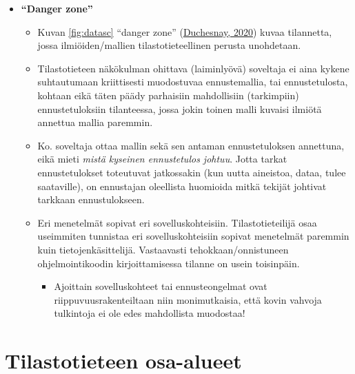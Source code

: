 \documentclass[
]{book}
\providecommand{\tightlist}{%
  \setlength{\itemsep}{0pt}\setlength{\parskip}{0pt}}
\begin{document}
\begin{itemize}
\tightlist
\item
  \textbf{``Danger zone''}

  \begin{itemize}
  \tightlist
  \item
    Kuvan \ref{fig:datasc} ``danger zone'' (\href{https://duchesnay.github.io/pystatsml/introduction/machine_learning.html}{Duchesnay, 2020}) kuvaa tilannetta, jossa ilmiöiden/mallien tilastotieteellinen perusta unohdetaan.
  \item
    Tilastotieteen näkökulman ohittava (laiminlyövä) soveltaja ei aina kykene suhtautumaan kriittisesti muodostuvaa ennustemallia, tai ennustetulosta, kohtaan eikä täten päädy parhaisiin mahdollisiin (tarkimpiin) ennustetuloksiin tilanteessa, jossa jokin toinen malli kuvaisi ilmiötä annettua mallia paremmin.
  \item
    Ko. soveltaja ottaa mallin sekä sen antaman ennustetuloksen annettuna, eikä mieti \emph{mistä kyseinen ennustetulos johtuu}. Jotta tarkat ennustetulokset toteutuvat jatkossakin (kun uutta aineistoa, dataa, tulee saataville), on ennustajan oleellista huomioida mitkä tekijät johtivat tarkkaan ennustulokseen.
  \item
    Eri menetelmät sopivat eri sovelluskohteisiin. Tilastotieteilijä osaa useimmiten tunnistaa eri sovelluskohteisiin sopivat menetelmät paremmin kuin tietojenkäsittelijä. Vastaavasti tehokkaan/onnistuneen ohjelmointikoodin kirjoittamisessa tilanne on usein toisinpäin.

    \begin{itemize}
    \tightlist
    \item
      Ajoittain sovelluskohteet tai ennusteongelmat ovat riippuvuusrakenteiltaan niin monimutkaisia, että kovin vahvoja tulkintoja ei ole edes mahdollista muodostaa!
    \end{itemize}
  \end{itemize}
\end{itemize}

\hypertarget{alaluku34}{%
\section{Tilastotieteen osa-alueet}\label{alaluku34}}
\end{document}
